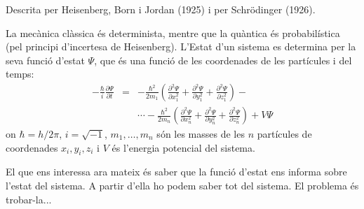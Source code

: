Descrita per Heisenberg, Born i Jordan (1925) i per Schrödinger (1926). 

La mecànica clàssica és determinista, mentre que la quàntica és probabilística (pel principi d'incertesa de Heisenberg). L'Estat d'un sistema es determina per la seva funció d'estat $\Psi$, que és una funció de les coordenades de les partícules i del temps:
\begin{eqnarray}
-\frac{\hbar}{i} \frac{\partial \Psi}{\partial t}&=&-\frac{\hbar^2}{2m_1}\left(\frac{\partial^2\Psi}{\partial x_1^2}+\frac{\partial^2\Psi}{\partial y_1^2}+\frac{\partial^2\Psi}{\partial z_1^2} \right)-\\
 & & \cdots -\frac{\hbar^2}{2m_n}\left(\frac{\partial^2\Psi}{\partial x_n^2}+\frac{\partial^2\Psi}{\partial y_n^2}+\frac{\partial^2\Psi}{\partial z_n^2} \right) + V \Psi
\end{eqnarray}
on $\hbar=h/2\pi$, $i=\sqrt{-1}$, $m_1,\dots , m_n$ són les masses de les $n$ partícules de coordenades $x_i,y_i,z_i$ i $V$ és l'energia potencial del sistema.

El que ens interessa ara mateix és saber que la funció d'estat ens informa sobre l'estat del sistema.
A partir d'ella ho podem saber tot del sistema. El problema és trobar-la...

